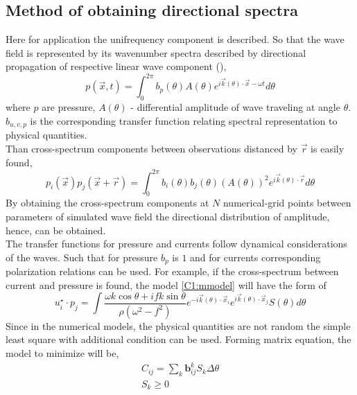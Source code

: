 \subsection{Method of obtaining directional spectra}
Here for application the unifrequency component is described. So that the wave field is represented by its wavenumber spectra described by directional propagation of respective linear wave component (\cite{long1986inverse}),
\begin{equation}
p(\vec{x}, t) = \int_{0}^{2\pi} b_{p}(\theta) A(\theta) e^{i \vec{k}(\theta) \cdot \vec{x} - \omega t} d \theta
\end{equation}
where $p$ are pressure, $A(\theta)$ - differential amplitude of wave traveling at angle $\theta$. $b_{u,v,p}$ is the corresponding transfer function relating spectral representation to physical quantities.\\
Than cross-spectrum components between observations distanced by $\vec{r}$ is easily found,
\begin{equation}
p_i(\vec{x}) p_j(\vec{x} + \vec{r}) = \int_{0}^{2\pi} b_{i}(\theta) b_{j}(\theta) (A(\theta))^2 e^{i \vec{k}(\theta) \cdot \vec{r}} d \theta \label{C1:mmodel}
\end{equation}
By obtaining the cross-spectrum components at $N$ numerical-grid points between parameters of simulated wave field the directional distribution of amplitude, hence, can be obtained.\\
The transfer functions for pressure and currents follow dynamical considerations of the waves. Such that for pressure $b_{p}$ is $1$ and for currents corresponding polarization relations can be used. For example, if the cross-spectrum between current and pressure is found, the model \eqref{C1:mmodel} will have the form of
\begin{equation}
u_i^{\star} \cdot p_j = \int \frac{\omega k \cos \theta + i fk \sin \theta}{\rho(\omega^2 - f^2)} e^{-i \vec{k}(\theta) \cdot \vec{x}_i} e^{i \vec{k}(\theta) \cdot \vec{x}_j}  S(\theta) d \theta
\end{equation}
Since in the numerical models, the physical quantities are not random the simple least square with additional condition can be used. Forming matrix equation, the model to minimize will be,
\begin{subequations}
\begin{align}
C_{ij} = \sum_k \textbf{b}_{ij}^k S_k \Delta \theta \label{C1:ls.a} \\
S_k \geq 0 \label{C1:ls.b}
\end{align}
\end{subequations}
